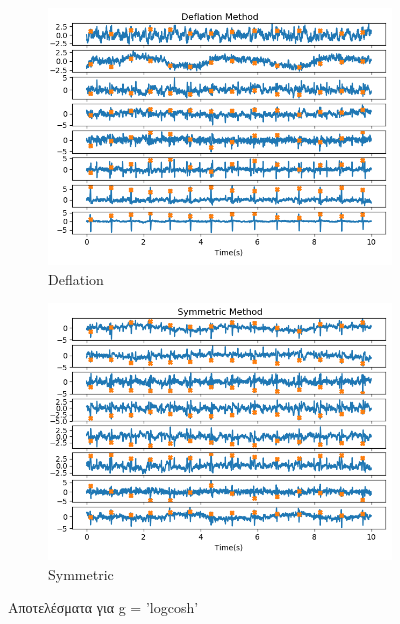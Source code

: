 \begin{figure}[H]
    \centering
    \begin{subfigure}{0.48 \textwidth}
        \centering
       \includegraphics[width=\textwidth]{daisy/logcosh_def.png} \en
        \caption{Deflation} \gr
        \label{fig:5.29a}
    \end{subfigure}
    \hfill
    \begin{subfigure}{0.48 \textwidth}
        \centering
       \includegraphics[width=\textwidth]{daisy/logcosh_sym.png} \en
        \en
        \caption{Symmetric} \gr
        \label{fig:5.29b}
    \end{subfigure}
    \gr
    \caption{Αποτελέσματα για \en g = 'logcosh' \gr}
\end{figure}
